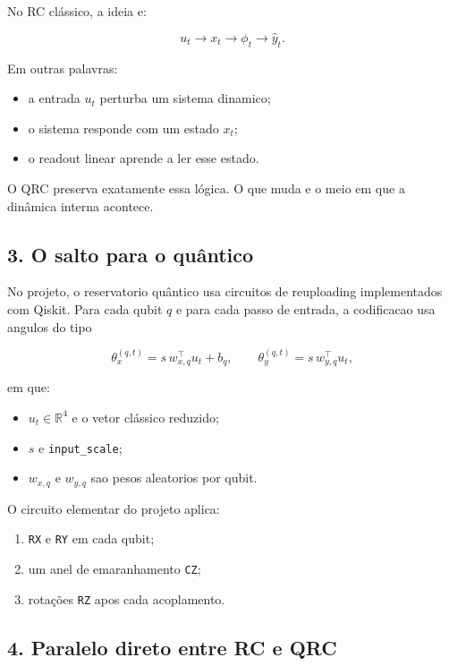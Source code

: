 \documentclass[12pt]{article}
\providecommand{\tightlist}{%
          \setlength{\itemsep}{0pt}\setlength{\parskip}{0pt}}
\begin{document}
No RC clássico, a ideia e:

\[
u_t \longrightarrow x_t \longrightarrow \phi_t \longrightarrow \hat{y}_t.
\]

Em outras palavras:

\begin{itemize}
\tightlist
\item
  a entrada \(u_t\) perturba um sistema dinamico;
\item
  o sistema responde com um estado \(x_t\);
\item
  o readout linear aprende a ler esse estado.
\end{itemize}

O QRC preserva exatamente essa lógica. O que muda e o meio em que a dinâmica interna acontece.

\subsection{3. O salto para o quântico}\label{3-o-salto-para-o-quuxe2ntico}

No projeto, o reservatorio quântico usa circuitos de reuploading implementados com Qiskit. Para cada qubit \(q\) e para cada passo de entrada, a codificacao usa angulos do tipo

\[
\theta^{(q,t)}_x = s \, w_{x,q}^\top u_t + b_q,
\qquad
\theta^{(q,t)}_y = s \, w_{y,q}^\top u_t,
\]

em que:

\begin{itemize}
\tightlist
\item
  \(u_t \in \mathbb{R}^4\) e o vetor clássico reduzido;
\item
  \(s\) e \texttt{input\_scale};
\item
  \(w_{x,q}\) e \(w_{y,q}\) sao pesos aleatorios por qubit.
\end{itemize}

O circuito elementar do projeto aplica:

\begin{enumerate}
\def\labelenumi{\arabic{enumi}.}
\tightlist
\item
  \texttt{RX} e \texttt{RY} em cada qubit;
\item
  um anel de emaranhamento \texttt{CZ};
\item
  rotações \texttt{RZ} apos cada acoplamento.
\end{enumerate}

\subsection{4. Paralelo direto entre RC e QRC}\label{4-paralelo-direto-entre-rc-e-qrc}
\end{document}
